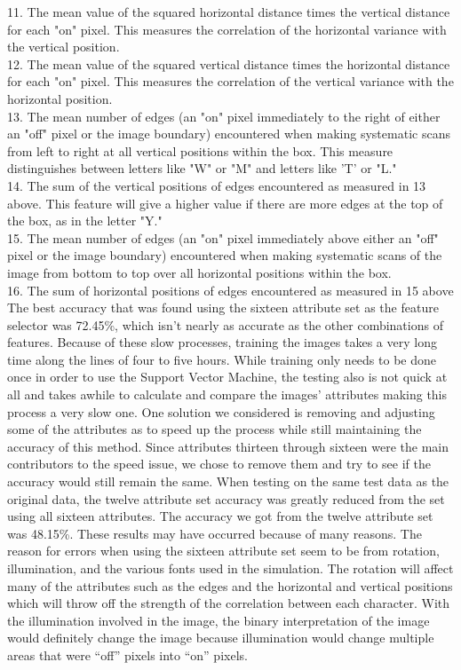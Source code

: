 11. The mean value of the squared horizontal distance times the vertical distance for each "on" pixel. 	This measures the correlation of the horizontal variance with the vertical position.\\
12. The mean value of the squared vertical distance times the horizontal distance for each "on" pixel. 	This measures the correlation of the vertical variance with the horizontal position.\\
13. The mean number of edges (an "on" pixel immediately to the right of either an "off" pixel or the 	image boundary) encountered when making systematic scans from left to right at all vertical 	positions within the box. This measure distinguishes between letters like "W" or "M" and letters 	like 'T' or "L."\\
14. The sum of the vertical positions of edges encountered as measured in 13 above. This feature will 	give a higher value if there are more edges at the top of the box, as in the letter "Y."\\
15. The mean number of edges (an "on" pixel immediately above either an "off" pixel or the image 	boundary) encountered when making systematic scans of the image from bottom to top over all 	horizontal positions within the box.\\
16. The sum of horizontal positions of edges encountered as measured in 15 above
The best accuracy that was found using the sixteen attribute set as the feature selector was 72.45\%, 
which isn't nearly as accurate as the other combinations of features. Because of these slow processes, 
training the images takes a very long time along the lines of four to five hours. While training only needs 
to be done once in order to use the Support Vector Machine, the testing also is not quick at all and takes 
awhile to calculate and compare the images' attributes making this process a very slow one.  
One solution we considered is removing and adjusting some of the attributes as to speed up the 
process while still maintaining the accuracy of this method.  Since attributes thirteen through 
sixteen were the main contributors to the speed issue, we chose to remove them and try to see if 
the accuracy would still remain the same.  When testing on the same test data as the original data, 
the twelve attribute set accuracy was greatly reduced from the set using all sixteen attributes.  
The accuracy we got from the twelve attribute set was 48.15\%.  
These results may have occurred because of many reasons.  
The reason for errors when using the sixteen attribute set seem to be 
from rotation, illumination, and the various fonts used in the simulation.  
The rotation will affect many of the attributes such as the edges and the horizontal 
and vertical positions which will throw off the strength of the correlation between each 
character.  With the illumination involved in the image, the binary interpretation of the 
image would definitely change the image because illumination would change multiple areas that 
were “off” pixels into “on” pixels. \\

